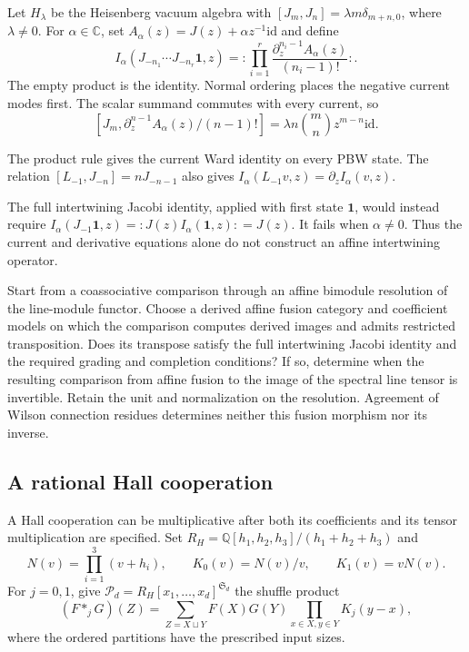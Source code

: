 \begin{example}\label{cylev:ex:ward-jacobi}
Let $H_\lambda$ be the Heisenberg vacuum algebra with
$[J_m,J_n]=\lambda m\delta_{m+n,0}$, where $\lambda\ne0$.
For $\alpha\in\mathbb C$, set
$A_\alpha(z)=J(z)+\alpha z^{-1}\mathrm{id}$ and define
\[
 I_\alpha(J_{-n_1}\cdots J_{-n_r}\mathbf1,z)
   ={:}\prod_{i=1}^r
                 \frac{\partial_z^{n_i-1}A_\alpha(z)}{(n_i-1)!}{:}.
\]
The empty product is the identity.
Normal ordering places the negative current modes first.
The scalar summand commutes with every current, so
\[
 [J_m,\partial_z^{n-1}A_\alpha(z)/(n-1)!]
                  =\lambda n\binom mn z^{m-n}\mathrm{id}.
\]

The product rule gives the current Ward identity on every PBW state.
The relation $[L_{-1},J_{-n}]=nJ_{-n-1}$ also gives
$I_\alpha(L_{-1}v,z)=\partial_zI_\alpha(v,z)$.

The full intertwining Jacobi identity, applied with first state
$\mathbf1$, would instead require
$I_\alpha(J_{-1}\mathbf1,z)={:}J(z)I_\alpha(\mathbf1,z){:}=J(z)$.
It fails when $\alpha\ne0$.
Thus the current and derivative equations alone do not construct an
affine intertwining operator.
\end{example}

\begin{problem}\label{cylev:prob:line-field}
Start from a coassociative comparison through an affine bimodule
resolution of the line-module functor.
Choose a derived affine fusion category and coefficient models on
which the comparison computes derived images and admits restricted
transposition.
Does its transpose satisfy the full intertwining Jacobi identity
and the required grading and completion conditions?
If so, determine when the resulting comparison from affine fusion
to the image of the spectral line tensor is invertible.
Retain the unit and normalization on the resolution.
Agreement of Wilson connection residues determines neither this
fusion morphism nor its inverse.
\end{problem}

\subsection{A rational Hall cooperation}

A Hall cooperation can be multiplicative after both its coefficients
and its tensor multiplication are specified.
Set $R_H=\mathbb Q[h_1,h_2,h_3]/(h_1+h_2+h_3)$ and
\[
 N(v)=\prod_{i=1}^3(v+h_i),\qquad
 K_0(v)=N(v)/v,\qquad K_1(v)=vN(v).
\]
For $j=0,1$, give
$\mathcal P_d=R_H[x_1,\ldots,x_d]^{\mathfrak S_d}$
the shuffle product
\[
 (F*_jG)(Z)=
 \sum_{Z=X\sqcup Y}F(X)G(Y)\prod_{x\in X,y\in Y}K_j(y-x),
\]
where the ordered partitions have the prescribed input sizes.

